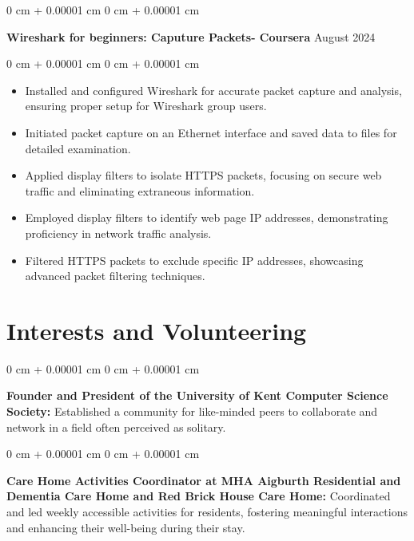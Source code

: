 \documentclass[10pt, letterpaper]{article}
\newenvironment{highlights}{
    \begin{itemize}[
        topsep=0.10 cm,
        parsep=0.10 cm,
        partopsep=0pt,
        itemsep=0pt,
        leftmargin=0 cm + 10pt
    ]
}{
    \end{itemize}
} %
\newenvironment{onecolentry}{
    \begin{adjustwidth}{
        0 cm + 0.00001 cm
    }{
        0 cm + 0.00001 cm
    }
}{
    \end{adjustwidth}
} %
\newenvironment{twocolentry}[2][]{
    \onecolentry
    \def\secondColumn{#2}
    \setcolumnwidth{\fill, 4.5 cm}
    \begin{paracol}{2}
}{
    \switchcolumn \raggedleft \secondColumn
    \end{paracol}
    \endonecolentry
} %
\begin{document}
        \vspace{0.2 cm}
       
        

        \begin{twocolentry}{
            August 2024
        }
            \textbf{Wireshark for beginners: Caputure Packets- Coursera}\end{twocolentry}

        \vspace{0.05 cm}
        \begin{onecolentry}
            \begin{highlights}
                \item Installed and configured Wireshark for accurate packet capture and analysis, ensuring proper setup for Wireshark group users.
                \item Initiated packet capture on an Ethernet interface and saved data to files for detailed examination.
                \item Applied display filters to isolate HTTPS packets, focusing on secure web traffic and eliminating extraneous information.
                \item Employed display filters to identify web page IP addresses, demonstrating proficiency in network traffic analysis.
                \item Filtered HTTPS packets to exclude specific IP addresses, showcasing advanced packet filtering techniques.
            \end{highlights}
        \end{onecolentry}
   

 \section{Interests and Volunteering}
        
        \begin{onecolentry}
            \textbf{Founder and President of the University of Kent Computer Science Society:} Established a community for like-minded peers to collaborate and network in a field often perceived as solitary.
        \end{onecolentry}

        \vspace{0.05 cm}

        \begin{onecolentry}
            \textbf{Care Home Activities Coordinator at MHA Aigburth Residential and Dementia Care Home and Red Brick House Care Home:} Coordinated and led weekly accessible activities for residents, fostering meaningful interactions and enhancing their well-being during their stay. 
        \end{onecolentry}
         \vspace{0.05 cm}
\end{document}
